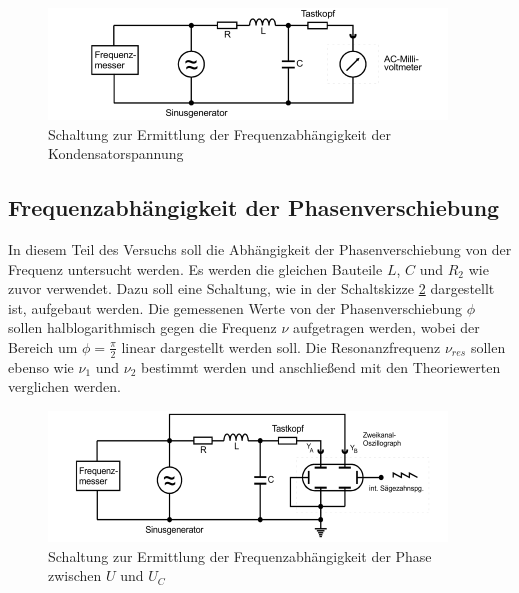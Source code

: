 \begin{figure}[H]
  \centering
  \includegraphics{content/aufgabeC.png}
  \caption{Schaltung zur Ermittlung der Frequenzabhängigkeit der Kondensatorspannung \cite{sample354}}
  \label{fig:gsk4}
\end{figure}


\subsection{Frequenzabhängigkeit der Phasenverschiebung}

In diesem Teil des Versuchs soll die Abhängigkeit der Phasenverschiebung von der Frequenz untersucht werden.
Es werden die gleichen Bauteile $L$, $C$ und $R_2$ wie zuvor verwendet.  
Dazu soll eine Schaltung, wie in der Schaltskizze \ref{fig:gsk5} dargestellt ist, aufgebaut werden.
Die gemessenen Werte von der Phasenverschiebung $\phi$ sollen halblogarithmisch gegen die Frequenz $\nu$
aufgetragen werden, wobei der Bereich um $\phi = \frac{\pi}{2}$ linear dargestellt werden soll.
Die Resonanzfrequenz $\nu_{res}$ sollen ebenso wie $\nu_1$ und $\nu_2$ bestimmt werden und anschließend
mit den Theoriewerten verglichen werden. 

\begin{figure}[H]
  \centering
  \includegraphics{content/aufgabeD.png}
  \caption{Schaltung zur Ermittlung der Frequenzabhängigkeit der Phase zwischen $U$ und $U_C$ \cite{sample354}}
  \label{fig:gsk5}
\end{figure}

